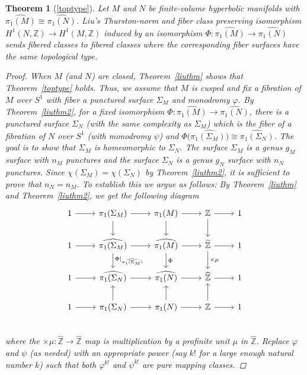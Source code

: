 \documentclass[12pt, reqno,oneside]{amsart}
\theoremstyle{definition}
\theoremstyle{plain}
\theoremstyle{TheoremNum}
\newtheorem{thmn}{Theorem}
\newcommand{\Z}{{\mathbb Z}}
\numberwithin{equation}{section}
\numberwithin{table}{section}
\begin{document}
\begin{thmn}[\ref{toptype}]
Let $M$ and $N$ be finite-volume hyperbolic manifolds with $\widehat{\pi_1(M)}\cong\widehat{\pi_1(N)}$. Liu's Thurston-norm and fiber class preserving isomorphism $H^1(N,\Z)\to H^1(M,\Z)$ induced by an isomorphism $\Phi:\widehat{\pi_1(M)}\to\widehat{\pi_1(N)}$ sends fibered classes to fibered classes where the corresponding fiber surfaces have the same topological type.
\begin{proof}
When $M$ (and $N$) are closed, Theorem~\ref{liuthm} shows that Theorem~\ref{toptype} holds. Thus, we assume that $M$ is cusped and fix a fibration of $M$ over $S^1$ with fiber a punctured surface $\Sigma_M$ and monodromy $\varphi$. By Theorem~\ref{liuthm2}, for a fixed isomorphism $\Phi:\widehat{\pi_1(M)}\to\widehat{\pi_1(N)}$, there is a punctured surface $\Sigma_N$ (with the same complexity as $\Sigma_M$) which is the fiber of a fibration of $N$ over $S^1$ (with monodromy $\psi$) and $\Phi(\widehat{\pi_1(\Sigma_M))}\cong\widehat{\pi_1(\Sigma_N)}$. The goal is to show that $\Sigma_M$ is homeomorphic to $\Sigma_N$. The surface $\Sigma_M$ is a genus $g_M$ surface with $n_M$ punctures and the surface $\Sigma_N$ is a genus $g_N$ surface with $n_N$ punctures. Since $\chi(\Sigma_M)=\chi(\Sigma_N)$ by Theorem~\ref{liuthm2}, it is sufficient to prove that $n_N=n_M$. To establish this we argue as follows: \medbreak By Theorem~\ref{liuthm} and Theorem~\ref{liuthm2}, we get the following diagram
 \[
   \begin{tikzcd}
  1 \arrow[r] &\pi_1(\Sigma_M)\arrow[r]\arrow[d] &\pi_1(M)\arrow[r]\arrow[d] &\Z\arrow[r]\arrow[d] & 1
    \\
    1 \arrow[r] &\widehat{\pi_1(\Sigma_M)}\arrow[r]\arrow[d, "\Phi|_{\widehat{\pi_1(\Sigma_M)}}"] &\widehat{\pi_1(M)}\arrow[r]\arrow[d, "\Phi"] &\widehat{\Z}\arrow[r]\arrow[d, "\times \mu"] & 1
    \\
    1 \arrow[r] &\widehat{\pi_1(\Sigma_N)}\arrow[r] &\widehat{\pi_1(N)}\arrow[r] &\widehat{\Z}\arrow[r] & 1
    \\
    1 \arrow[r] &\pi_1(\Sigma_N)\arrow[r]\arrow[u] &\pi_1(N)\arrow[r]\arrow[u] &\Z\arrow[r]\arrow[u] & 1
    \\
 \end{tikzcd}
\]
where the $\times\mu:\hat{\Z}\to\hat{\Z}$ map is multiplication by a profinite unit $\mu$ in $\hat{\Z}$. Replace $\varphi$ and $\psi$ (as needed) with an appropriate power (say $k!$ for a large enough natural number $k$) such that both $\varphi^{k!}$ and $\psi^{k!}$ are pure mapping classes. 

\end{proof}
\end{thmn}
\end{document}
